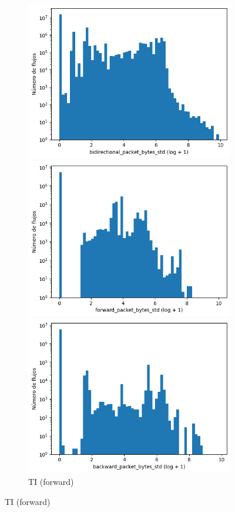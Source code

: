 \begin{figure}[H]
\begin{subfigure}[b]{0.26\textwidth}
        \includegraphics[width=\linewidth]{media/packet_pincer_toniot/bidirectional_packet_bytes_std_log_x_log_y.png}
        \caption{TI (bidir.)}
        \includegraphics[width=\textwidth]{media/packet_pincer_botiot/forward_packet_bytes_std_log_x_log_y.png}
        \caption{TI (forward)}
        \includegraphics[width=\textwidth]{media/packet_pincer_botiot/backward_packet_bytes_std_log_x_log_y.png}

\end{subfigure}
\end{figure}

